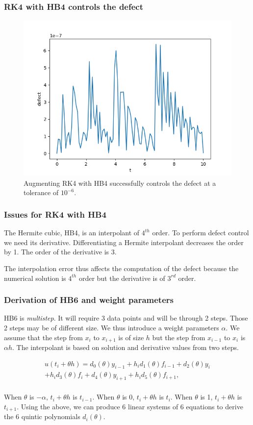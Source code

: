 \documentclass{beamer}
\begin{document}
\begin{frame}
\frametitle{RK4 with HB4 controls the defect}
\begin{figure}[H]
    \centering
    \includegraphics[width=0.7\linewidth]{./figures/rk4_with_hb4_p1_global_defect}
    \caption{Augmenting RK4 with HB4 successfully controls the defect at a tolerance of $10^{-6}$.}
    \label{fig:rk4_with_hb4_p1_global_defect}
\end{figure}
\end{frame}    

\begin{frame}
\frametitle{Issues for RK4 with HB4}
The Hermite cubic, HB4, is an interpolant of $4^{th}$ order.
To perform defect control we need its derivative.
Differentiating a Hermite interpolant decreases the order by 1.
The order of the derivative is 3. 

The interpolation error thus affects the computation of the defect because the numerical solution is $4^{th}$ order but the derivative is of $3^{rd}$ order.
\end{frame}

\begin{frame}
\frametitle{Derivation of HB6 and weight parameters}
HB6 is \emph{multistep}. It will require 3 data points and will be through 2 steps. Those 2 steps may be of different size. 
We thus introduce a weight parameters $\alpha$.
We assume that the step from $x_i$ to $x_{i + 1}$ is of size $h$ but the step from $x_{i - 1}$ to $x_i$ is $\alpha h$. 
The interpolant is based on solution and derivative values from two steps.

\begin{equation}
\begin{split}
u(t_i + \theta h) = d_{0}(\theta) y_{i-1} +  h_id_{1}(\theta)f_{i-1}
+ d_{2}(\theta)y_i  \\   +  h_id_{3}(\theta)f_i
+ d_{4}(\theta)y_{i + 1} + h_id_{5}(\theta)f_{i + 1}, \\
\end{split}
\end{equation}

When $\theta$ is $-\alpha$, $t_i + \theta h$ is $t_{i - 1}$.
When $\theta$ is 0, $t_i + \theta h$ is $t_i$.
When $\theta$ is 1, $t_i + \theta h$ is $t_{i + 1}$.
Using the above, we can produce 6 linear systems of 6 equations to derive the 6 quintic polynomials $d_i(\theta)$.
\end{frame}
\end{document}
